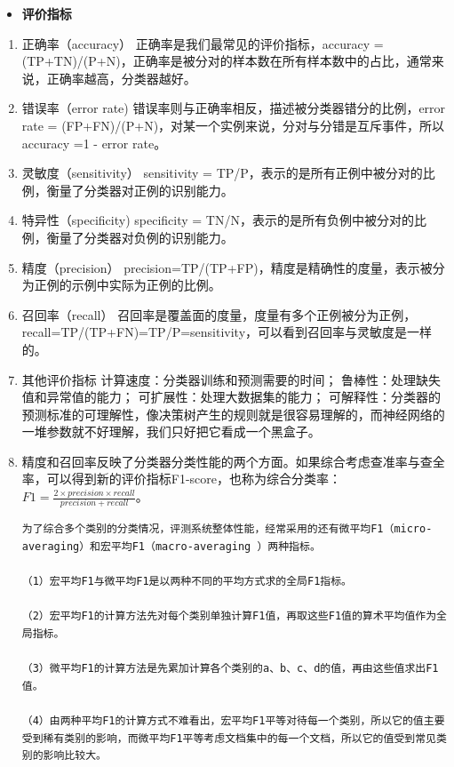 \begin{itemize}
\item
  \textbf{评价指标}
\end{itemize}

\begin{enumerate}
\def\labelenumi{\arabic{enumi})}
\item
  正确率（accuracy） 正确率是我们最常见的评价指标，accuracy =
  (TP+TN)/(P+N)，正确率是被分对的样本数在所有样本数中的占比，通常来说，正确率越高，分类器越好。
\item
  错误率（error rate)
  错误率则与正确率相反，描述被分类器错分的比例，error rate =
  (FP+FN)/(P+N)，对某一个实例来说，分对与分错是互斥事件，所以accuracy =1
  - error rate。
\item
  灵敏度（sensitivity） sensitivity =
  TP/P，表示的是所有正例中被分对的比例，衡量了分类器对正例的识别能力。
\item
  特异性（specificity) specificity =
  TN/N，表示的是所有负例中被分对的比例，衡量了分类器对负例的识别能力。
\item
  精度（precision）
  precision=TP/(TP+FP)，精度是精确性的度量，表示被分为正例的示例中实际为正例的比例。
\item
  召回率（recall）
  召回率是覆盖面的度量，度量有多个正例被分为正例，recall=TP/(TP+FN)=TP/P=sensitivity，可以看到召回率与灵敏度是一样的。
\item
  其他评价指标 计算速度：分类器训练和预测需要的时间；
  鲁棒性：处理缺失值和异常值的能力； 可扩展性：处理大数据集的能力；
  可解释性：分类器的预测标准的可理解性，像决策树产生的规则就是很容易理解的，而神经网络的一堆参数就不好理解，我们只好把它看成一个黑盒子。
\item
  精度和召回率反映了分类器分类性能的两个方面。如果综合考虑查准率与查全率，可以得到新的评价指标F1-score，也称为综合分类率：$F1=\frac{2 \times precision \times recall}{precision + recall}​$。

\begin{verbatim}
为了综合多个类别的分类情况，评测系统整体性能，经常采用的还有微平均F1（micro-averaging）和宏平均F1（macro-averaging ）两种指标。

（1）宏平均F1与微平均F1是以两种不同的平均方式求的全局F1指标。

（2）宏平均F1的计算方法先对每个类别单独计算F1值，再取这些F1值的算术平均值作为全局指标。

（3）微平均F1的计算方法是先累加计算各个类别的a、b、c、d的值，再由这些值求出F1值。

（4）由两种平均F1的计算方式不难看出，宏平均F1平等对待每一个类别，所以它的值主要受到稀有类别的影响，而微平均F1平等考虑文档集中的每一个文档，所以它的值受到常见类别的影响比较大。
\end{verbatim}
\end{enumerate}

